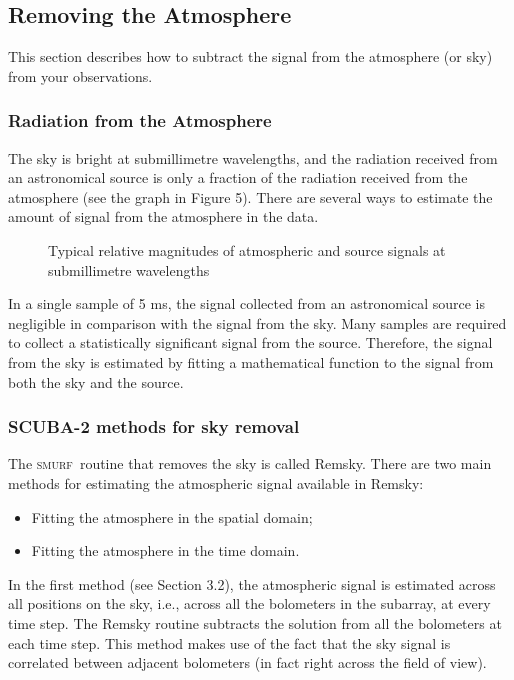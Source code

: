 \documentclass[twoside,11pt]{article}
\renewcommand{\_}{\texttt{\symbol{95}}}
\newcommand{\SMURF}{\textsc{smurf}}
\begin{document}
\subsection{Removing the Atmosphere}

This section describes how to subtract the signal from the atmosphere
(or sky) from your observations.

\subsubsection{Radiation from the Atmosphere}

The sky is bright at submillimetre wavelengths, and the radiation received from
an astronomical source is only a fraction of the radiation received from the
atmosphere (see the graph in Figure 5). There are several ways to estimate the
amount of signal from the atmosphere in the data.

\begin{figure}
\caption{Typical relative magnitudes of atmospheric and source signals
  at submillimetre wavelengths}
\end{figure}

In a single sample of 5 ms, the signal collected from an astronomical
source is negligible in comparison with the signal from the sky. Many
samples are required to collect a statistically significant signal
from the source. Therefore, the signal from the sky is estimated by
fitting a mathematical function to the signal from both the sky and
the source.

\subsubsection{SCUBA-2 methods for sky removal}

The \SMURF\ routine that removes the sky is called Remsky. There are two main
methods for estimating the atmospheric signal available in Remsky:
\begin{itemize}
\item Fitting the atmosphere in the spatial domain;
\item Fitting the atmosphere in the time domain.
\end{itemize}

In the first method (see Section 3.2), the atmospheric signal is
estimated across all positions on the sky, i.e., across all the
bolometers in the subarray, at every time step. The Remsky routine
subtracts the solution from all the bolometers at each time step. This
method makes use of the fact that the sky signal is correlated between
adjacent bolometers (in fact right across the field of view).
\end{document}
